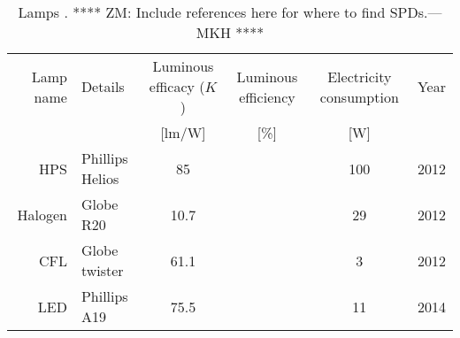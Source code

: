 

\begin{table}
\centering %
\caption{Lamps  \cite{aube2013}. **** ZM: Include references here for where to find SPDs.---MKH ****}
\begin{tabular}{r l c c c c}
  \toprule
  Lamp name 
      & Details 
      & Luminous efficacy ($K$) 
      & Luminous efficiency
      & Electricity consumption 
      & Year  \\
  
      &
      & [lm/W]
      & [\%]
      & [W] 
      & \\
  \midrule
  HPS   
      & Phillips Helios
      & 85
      & 
      & 100
      & 2012 \\
  Halogen
      & Globe R20
      & 10.7
      &
      & 29
      & 2012\\
  CFL
      & Globe twister
      & 61.1
      &  
      & 3
      & 2012 \\
  LED
      & Phillips A19
      & 75.5
      &  
      & 11
      & 2014 \\
  \bottomrule
\end{tabular}
\label{tab:lamps}
\end{table}

